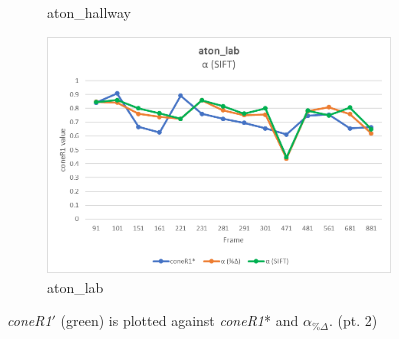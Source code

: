 \begin{appendices}
\begin{figure}
\begin{subfigure}{.45\linewidth}
  \caption{aton\_hallway}
\end{subfigure}
\hfill
\begin{subfigure}{.45\linewidth}
  \includegraphics[width=1\linewidth]{figures/appendix/lab_sift.jpg}
  \caption{aton\_lab}
\end{subfigure}

\caption{\textit{coneR1}$'$ (green) is plotted against \textit{coneR1}* and $\alpha_{\%\Delta}$. (pt. 2)}
\end{figure}


\end{appendices}
